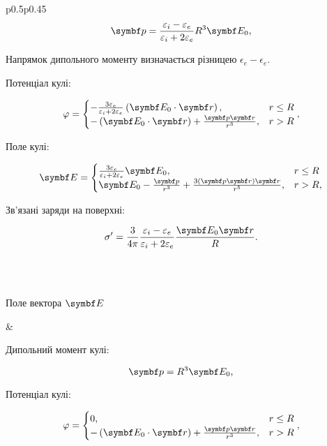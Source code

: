 \begin{center}
\begin{longtable}{p{}p{}}
		\[\vect{p} = \frac{\epsilon_i - \epsilon_e}{\epsilon_i + 2\epsilon_e}R^3\Efield_0,\]

		{\footnotesize Напрямок дипольного моменту визначається різницею $\epsilon_e - \epsilon_e$.}

		Потенціал кулі:

		\[
			\phi =
			\begin{cases}
				-\frac{3\epsilon_e}{\epsilon_i + 2\epsilon_e}\left( \Efield_0\cdot \vect{r}\right), & r \le R \\
				-\left( \Efield_0\cdot \vect{r}\right) + \frac{\vect{p} \vect{r}}{r^3},             & r > R
			\end{cases}
			,\]

		Поле кулі:

		\[
			\Efield =
			\begin{cases}
				\frac{3\epsilon_e}{\epsilon_i + 2\epsilon_e} \Efield_0,                                 & r \le R \\
				\Efield_0 - \frac{\vect{p}}{r^3} + \frac{3\left(\vect{p}\vect{r}\right)\vect{r} }{r^5}, & r > R,
			\end{cases}
		\]

		Зв'язані заряди на поверхні:

		\[\sigma' = \frac{3}{4\pi} \frac{\epsilon_i - \epsilon_e}{\epsilon_i + 2\epsilon_e} \frac{\Efield_0\vect{r}}{R}.\]


		\\
		\pagebreak
		                                                          \\



		\begin{center}
			Поле вектора $\Efield$
		\end{center}

		\begin{center}
			
		\end{center}

		 &

		Дипольний момент кулі:

		\[\vect{p} = R^3\Efield_0,\]

		Потенціал кулі:

		\[
			\phi =
			\begin{cases}
				0,                                                                      & r \le R \\
				-\left( \Efield_0\cdot \vect{r}\right) + \frac{\vect{p} \vect{r}}{r^3}, & r > R
			\end{cases}
			,\]


\end{longtable}
\end{center}
